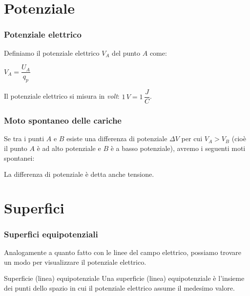 \documentclass[]{beamer}
\theoremstyle{plain}
\begin{document}
\section{Potenziale}


\begin{frame}
\frametitle{Potenziale elettrico}
Definiamo il potenziale elettrico $ V_A $ del punto $ A $ come:
\begin{center}
\colorbox{marroncino!30}{$ V_A = \dfrac{U_A}{q_p} $}
\end{center}
Il potenziale elettrico si misura in \emph{volt}: $ 1 \, V = 1 \, \dfrac{J}{C} $.\pause
\end{frame}





\begin{frame}
\frametitle{Moto spontaneo delle cariche}
Se tra i punti $ A $ e $ B $ esiste una differenza di potenziale $ \Delta V $ per cui \alert{$ V_A > V_B $} (cioè il punto $ A $ è ad alto potenziale e $ B $ è a basso potenziale), avremo i seguenti moti spontanei:
\begin{figure}
\end{figure}\pause
La differenza di potenziale è detta anche \alert{tensione}.
\end{frame}


\section{Superfici}

\begin{frame}
\frametitle{Superfici equipotenziali}
Analogamente a quanto fatto con le linee del campo elettrico, possiamo trovare un modo per visualizzare il potenziale elettrico.

\begin{block}{Superficie (linea) equipotenziale}
Una superficie (linea) equipotenziale è l'insieme dei punti dello spazio in cui il potenziale elettrico assume il medesimo valore.
\end{block}
\end{frame}
\end{document}
